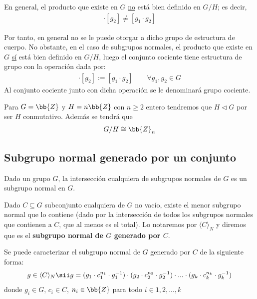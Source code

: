 En general, el producto que existe en $G$ \ul{no} está bien definido en $G/H$; es decir,
\begin{gather*}
    [g_1] \cdot [g_2] \neq [g_1\cdot g_2]
\end{gather*}

Por tanto, en general no se le puede otorgar a dicho grupo de estructura de cuerpo. No obstante, en el caso de subgrupos normales, el producto que existe en $G$ \ul{sí} está bien definido en $G/H$, luego el conjunto cociente tiene estructura de grupo con la operación dada por:
\begin{gather*}
    [g_1] \cdot [g_2] := [g_1\cdot g_2]\qquad \forall g_1,g_2\in G
\end{gather*}
Al conjunto cociente junto con dicha operación se le denominará grupo cociente.

\begin{ejemplo}
    Para $G=\bb{Z}$ y $H=n\bb{Z}$ con $n\geq 2$ entero tendremos que $H\lhd G$ por ser $H$ conmutativo. Además se tendrá que 
    \begin{gather*}
        G/H \cong \bb{Z}_n
    \end{gather*}
\end{ejemplo}

\subsection{Subgrupo normal generado por un conjunto}

\begin{observacion}
    Dado un grupo $G$, la intersección cualquiera de subgrupos normales de $G$ es un subgrupo normal en $G$.
\end{observacion}

\begin{definicion}
    Dado $C\subseteq G$ subconjunto cualquiera de $G$ no vacío, existe el menor subgrupo normal que lo contiene (dado por la intersección de todos los subgrupos normales que contienen a $C$, que al menos es el total). Lo notaremos por $\langle C  \rangle_N$ y diremos que es el \textbf{subgrupo normal de $G$ generado por $C$}.
\end{definicion}

\begin{observacion}
    Se puede caracterizar el subgrupo normal de $G$ generado por $C$ de la siguiente forma:
    \begin{gather*}
        g\in \langle C  \rangle_N \sii g = (g_1 \cdot c_1^{n_1} \cdot g_1^{-1}) \cdot (g_2 \cdot c_2^{n_2} \cdot g_2^{-1}) \cdot ... \cdot (g_k \cdot c_k^{n_k} \cdot g_k^{-1})
    \end{gather*}
    donde $g_i\in G$, $c_i\in C$, $n_i\in \bb{Z}$ para todo $i\in 1, 2, ..., k$
\end{observacion}

